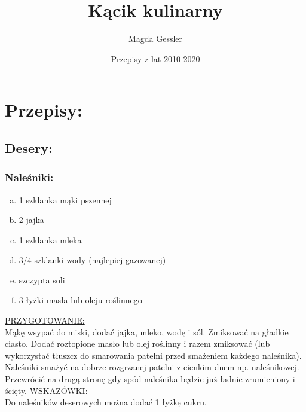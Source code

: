 \documentclass[12pt, letterpaper, titlepage]{article}
\title{Kącik kulinarny}
\author{Magda Gessler}
\date{Przepisy z lat 2010-2020}
\begin{document}
\maketitle


\newpage
\section{Przepisy:}
\subsection{Desery:}
\subsubsection{Naleśniki:}
\begin{enumerate}[a.]
\item 1 szklanka mąki pszennej
\item 2 jajka
\item 1 szklanka mleka
\item 3/4 szklanki wody (najlepiej gazowanej)
\item szczypta soli
\item 3 łyżki masła lub oleju roślinnego
\end{enumerate}
\underline{PRZYGOTOWANIE:} \\
Mąkę wsypać do miski, dodać jajka, mleko, wodę i sól. Zmiksować na gładkie ciasto. Dodać roztopione masło lub olej roślinny i razem zmiksować (lub wykorzystać tłuszcz do smarowania patelni przed smażeniem każdego naleśnika).\\
Naleśniki smażyć na dobrze rozgrzanej patelni z cienkim dnem np. naleśnikowej. Przewrócić na drugą stronę gdy spód naleśnika będzie już ładnie zrumieniony i ścięty.
\underline{WSKAZÓWKI:}\\
Do naleśników deserowych można dodać 1 łyżkę cukru.\\
\end{document}
